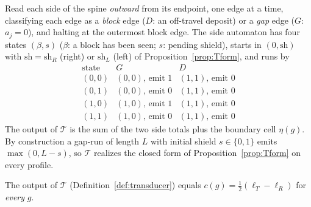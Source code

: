 \begin{definition}\label{def:transducer}
Read each side of the spine \emph{outward} from its endpoint, one edge at a time, classifying each
edge as a \emph{block} edge ($D$: an off-travel deposit) or a \emph{gap} edge ($G$: $a_j=0$), and
halting at the outermost block edge. The side automaton has four states $(\beta,s)$ ($\beta$: a block
has been seen; $s$: pending shield), starts in $(0,\mathrm{sh})$ with $\mathrm{sh}=\mathrm{sh}_R$
(right) or $\mathrm{sh}_L$ (left) of Proposition~\ref{prop:Tform}, and runs by
\[
\renewcommand{\arraystretch}{1.1}
\begin{array}{c|cc}
\text{state} & G & D\\\hline
(0,0) & (0,0),\,\text{emit }1 & (1,1),\,\text{emit }0\\
(0,1) & (0,0),\,\text{emit }0 & (1,1),\,\text{emit }0\\
(1,0) & (1,0),\,\text{emit }1 & (1,1),\,\text{emit }0\\
(1,1) & (1,0),\,\text{emit }0 & (1,1),\,\text{emit }0
\end{array}
\]
The output of $\mathcal T$ is the sum of the two side totals plus the boundary cell $\eta(g)$. By
construction a gap-run of length $L$ with initial shield $s\in\{0,1\}$ emits $\max(0,L-s)$, so
$\mathcal T$ realizes the closed form of Proposition~\ref{prop:Tform} on every profile.
\end{definition}

\begin{theorem}\label{thm:Bproved}
The output of $\mathcal T$ (Definition~\ref{def:transducer}) equals $c(g)=\tfrac12(\ell_T-\ell_R)$ for
\emph{every} $g$.
\end{theorem}

